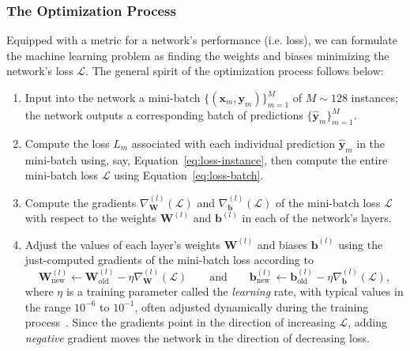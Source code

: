 \documentclass[11pt, a4paper]{article}
\renewcommand{\vec}[1]{\bm{#1}}
\newcommand{\mat}[1]{\mathbf{#1}}
\renewcommand{\grad}{\nabla}
\newcommand{\W}{\mat{W}}
\newcommand{\x}{\vec{x}}
\newcommand{\y}{\vec{y}}
\renewcommand{\b}{\vec{b}}
\begin{document}
\subsubsection{The Optimization Process} \label{sss:optimization}
Equipped with a metric for a network's performance (i.e. loss), we can formulate the machine learning problem as finding the weights and biases minimizing the network's loss $ \mathcal{L} $.
The general spirit of the optimization process follows below:
\begin{enumerate}

    \item \label{item:input} Input into the network a mini-batch $ \big\{(\x_{m}, \y_{m})\big\}_{m = 1}^{M} $ of $ M \sim 128 $ instances; the network outputs a corresponding batch of predictions $ \big\{\hat{\y}_{m}\big\}_{m = 1}^{M} $. %

    \item Compute the loss $ L_{m} $ associated with each individual prediction $ \hat{\y}_{m} $ in the mini-batch using, say, Equation~\ref{eq:loss-instance}, then compute the entire mini-batch loss $ \mathcal{L} $ using Equation~\ref{eq:loss-batch}.

    \item \label{item:backprop} Compute the  gradients $ \grad^{(l)}_{\W} (\mathcal{L}) $ and $ \grad^{(l)}_{\b} (\mathcal{L}) $ of the mini-batch loss $ \mathcal{L} $ with respect to the weights $ \W^{(l)} $ and $ \b^{(l)} $ in each of the network's layers.

    \item \label{item:update-params} Adjust the values of each layer's weights $ \W^{(l)} $ and biases $ \b^{(l)} $ using the just-computed gradients of the mini-batch loss according to
    \begin{equation*}
        \W^{(l)}_{\text{new}} \leftarrow \W^{(l)}_{\text{old}} - \eta \grad^{(l)}_{\W}(\mathcal{L}) \qquad \text{and} \qquad \b^{(l)}_{\text{new}} \leftarrow \b^{(l)}_{\text{old}} - \eta \grad^{(l)}_{\b}(\mathcal{L}),
    \end{equation*}
    where $ \eta $ is a training parameter called the \textit{learning} rate, with typical values in the range $ 10^{-6} $ to $ 10^{-1} $, often adjusted dynamically during the training process~\cite{homl}.
    Since the gradients point in the direction of increasing $ \mathcal{L} $, adding \textit{negative} gradient moves the network in the direction of decreasing loss.


\end{enumerate}
\end{document}
